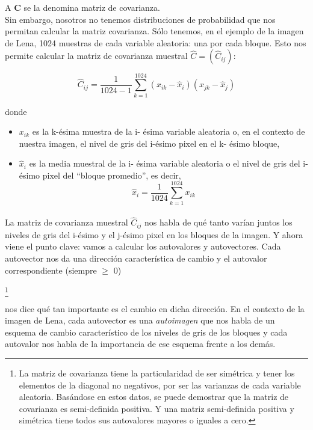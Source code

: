 \documentclass[twocolumn,a4paper,10pt]{article}
\begin{document}
A $\textbf{C}$ se la denomina matriz de covarianza.\\

Sin embargo, nosotros no tenemos distribuciones de probabilidad que nos permitan calcular la matriz covarianza. S\'olo tenemos, en el ejemplo de la imagen
de Lena, 1024 muestras de cada variable aleatoria: una por cada bloque. Esto nos permite calcular la matriz de covarianza muestral $\widehat{C} = (\widehat{C}_{ij})$:

\[ \widehat{C}_{ij} =  \frac{1}{1024 - 1}\sum_{k=1}^{1024} (x_{ik} - \widehat{x}_{i}) (x_{jk} - \widehat{x}_{j}) \]

donde
\begin{itemize}
    \item $x_{ik}$ es la k-\'esima muestra de la i- \'esima variable aleatoria o, en el contexto de nuestra imagen, el nivel de gris del i-\'esimo pixel en el 
    k- \'esimo bloque,
    \item $\widehat{x}_{i}$ es la media muestral de la i- \'esima variable aleatoria o el nivel de gris del i-\'esimo pixel del “bloque promedio”, es decir,
    \[ \widehat{x}_{i} = \frac{1}{1024} \sum_{k=1}^{1024} x_{ik} \]
\end{itemize}

\paragraph*{}

La matriz de covarianza muestral $\widehat{C}_{ij}$ nos habla de qu\'e tanto var\'ian juntos los niveles de gris del i-\'esimo y el j-\'esimo pixel en los bloques 
de la imagen. Y ahora viene  el punto clave: vamos a calcular los autovalores y autovectores. Cada autovector nos da una direcci\'on caracter\'istica de cambio y 
el autovalor correspondiente  (siempre $\geq$ 0) 

\footnote{La matriz de covarianza tiene la particularidad de ser sim\'etrica y tener los elementos de la diagonal no negativos, por ser las 
varianzas de cada variable aleatoria. Bas\'andose en estos datos, se puede demostrar que la matriz de covarianza es semi-definida positiva. Y una matriz semi-definida 
positiva y sim\'etrica tiene todos sus autovalores mayores o iguales a cero.}

 nos dice qu\'e tan importante es el cambio en dicha direcci\'on. En el contexto de la imagen de Lena, cada autovector es una \textit{autoimagen}
que nos habla de un esquema de cambio caracter\'istico de los niveles de gris de los bloques y cada autovalor nos habla de la importancia de ese esquema frente 
a los dem\'as. \\
\end{document}
